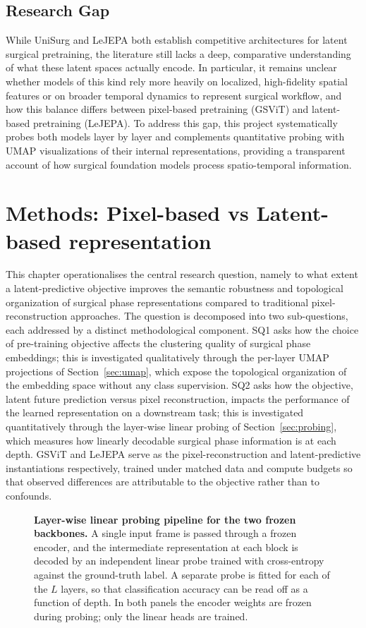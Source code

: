 \documentclass[11pt, a4paper]{article}
\begin{document}
\subsection{Research Gap} While UniSurg and LeJEPA both establish competitive architectures for latent surgical pretraining, the literature still lacks a deep, comparative understanding of what these latent spaces actually encode. In particular, it remains unclear whether models of this kind rely more heavily on localized, high-fidelity spatial features or on broader temporal dynamics to represent surgical workflow, and how this balance differs between pixel-based pretraining (GSViT) and latent-based pretraining (LeJEPA). To address this gap, this project systematically probes both models layer by layer and complements quantitative probing with UMAP visualizations of their internal representations, providing a transparent account of how surgical foundation models process spatio-temporal information.

\section{Methods: Pixel-based vs Latent-based representation}
This chapter operationalises the central research question, namely to 
what extent a latent-predictive objective improves the semantic 
robustness and topological organization of surgical phase 
representations compared to traditional pixel-reconstruction approaches. 
The question is decomposed into two sub-questions, each addressed by a 
distinct methodological component. SQ1 asks how the choice of 
pre-training objective affects the clustering quality of surgical phase 
embeddings; this is investigated qualitatively through the per-layer 
UMAP projections of Section~\ref{sec:umap}, which expose the topological 
organization of the embedding space without any class supervision. SQ2 
asks how the objective, latent future prediction versus pixel 
reconstruction, impacts the performance of the learned representation on 
a downstream task; this is investigated quantitatively through the 
layer-wise linear probing of Section~\ref{sec:probing}, which measures 
how linearly decodable surgical phase information is at each depth. 
GSViT and LeJEPA serve as the pixel-reconstruction and latent-predictive 
instantiations respectively, trained under matched data and compute 
budgets so that observed differences are attributable to the objective 
rather than to confounds.

\begin{figure}[t!]
\centering

\caption{\textbf{Layer-wise linear probing pipeline for the two frozen backbones.} A single input frame is passed through a frozen encoder, and the intermediate representation at each block is decoded by an independent linear probe trained with cross-entropy against the ground-truth label. A separate probe is fitted for each of the $L$ layers, so that classification accuracy can be read off as a function of depth. In both panels the encoder weights are frozen during probing; only the linear heads are trained.}
\label{fig:layer_probing}
\end{figure}
\newpage
\end{document}
